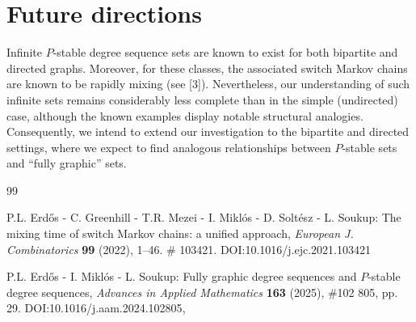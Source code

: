 \documentclass[11pt]{elsarticle}
\theoremstyle{plain}
\theoremstyle{definition}
\newcommand\DOI[1]{{DOI:#1}}
\begin{document}
\section{Future directions}
Infinite $P$-stable degree sequence sets are known to exist for both bipartite and directed graphs. Moreover, for these classes, the associated switch Markov chains are known to be rapidly mixing (see [3]). Nevertheless, our understanding of such infinite sets remains considerably less complete than in the simple (undirected) case, although the known examples display notable structural analogies. Consequently, we intend to extend our investigation to the bipartite and directed settings, where we expect to find analogous relationships between $P$-stable sets and “fully graphic” sets.


\begin{thebibliography}{99}







 P.L. Erdős - C. Greenhill - T.R. Mezei - I. Miklós  - D. Soltész - L. Soukup: The mixing time of switch Markov chains: a unified approach, {\sl European J. Combinatorics} {\bf 99} (2022),  1--46. \# 103421. \DOI{10.1016/j.ejc.2021.103421}

 P.L. Erdős - I. Miklós - L. Soukup: Fully graphic degree sequences and $P$-stable degree  sequences, {\sl Advances in Applied Mathematics} {\bf 163} (2025),  \#102 805, pp. 29. \DOI{10.1016/j.aam.2024.102805},



\end{thebibliography}
\end{document}
